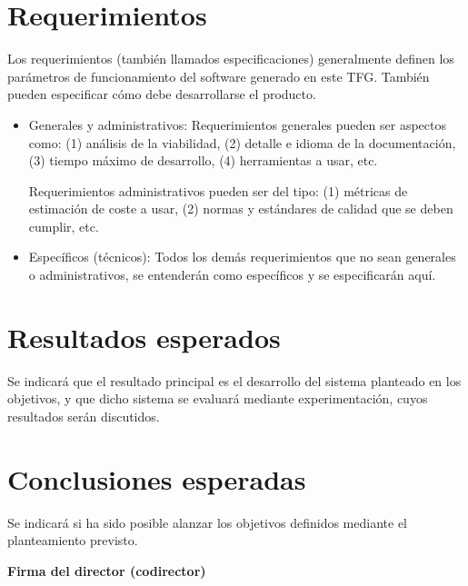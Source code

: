 \documentclass[titlepage, 12pt, a4paper, oneside]{article}
\begin{document}
\section{Requerimientos}
Los requerimientos (también llamados especificaciones) generalmente
definen los parámetros de funcionamiento del software generado en este
TFG. También pueden especificar cómo debe desarrollarse el producto.
\begin{itemize}
\item Generales y administrativos:
Requerimientos generales pueden ser aspectos como: (1) análisis de la
viabilidad, (2) detalle e idioma de la documentación, (3) tiempo
máximo de desarrollo, (4) herramientas a usar, etc.

Requerimientos administrativos pueden ser del tipo: (1) métricas de
estimación de coste a usar, (2) normas y estándares de calidad que se
deben cumplir, etc.

\item Específicos (técnicos):
Todos los demás requerimientos que no sean generales o
administrativos, se entenderán como específicos y se especificarán aquí.
\end{itemize}

\section{Resultados esperados}
Se indicará que el resultado principal es el desarrollo del sistema
planteado en los objetivos, y que dicho sistema se evaluará mediante
experimentación, cuyos resultados serán discutidos.

\section{Conclusiones esperadas}
Se indicará si ha sido posible alanzar los objetivos definidos
mediante el planteamiento previsto.




\begin{center}
  \textbf{Firma del director (codirector)}
\end{center}
\end{document}
